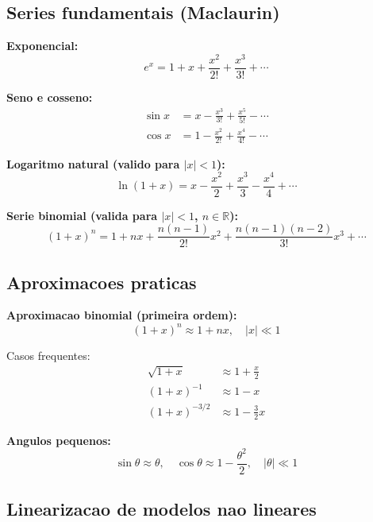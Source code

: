 \documentclass[12pt,a4paper]{article}
\begin{document}
\subsection*{Series fundamentais (Maclaurin)}

\textbf{Exponencial:}
\begin{equation}
e^x = 1 + x + \frac{x^2}{2!} + \frac{x^3}{3!} + \cdots
\end{equation}

\textbf{Seno e cosseno:}
\begin{align}
\sin x &= x - \frac{x^3}{3!} + \frac{x^5}{5!} - \cdots \\
\cos x &= 1 - \frac{x^2}{2!} + \frac{x^4}{4!} - \cdots
\end{align}

\textbf{Logaritmo natural (valido para $|x|<1$):}
\begin{equation}
\ln(1+x) = x - \frac{x^2}{2} + \frac{x^3}{3} - \frac{x^4}{4} + \cdots
\end{equation}

\textbf{Serie binomial (valida para $|x|<1$, $n \in \mathbb{R}$):}
\begin{equation}
(1+x)^n = 1 + nx + \frac{n(n-1)}{2!}x^2 + \frac{n(n-1)(n-2)}{3!}x^3 + \cdots
\end{equation}

\subsection*{Aproximacoes praticas}

\textbf{Aproximacao binomial (primeira ordem):}
\begin{equation}
(1+x)^n \approx 1 + nx, \quad |x| \ll 1
\end{equation}

Casos frequentes:
\begin{align}
\sqrt{1+x} &\approx 1 + \frac{x}{2} \\
(1+x)^{-1} &\approx 1 - x \\
(1+x)^{-3/2} &\approx 1 - \frac{3}{2}x
\end{align}

\textbf{Angulos pequenos:}
\begin{equation}
\sin\theta \approx \theta, \quad \cos\theta \approx 1 - \frac{\theta^2}{2}, \quad |\theta| \ll 1
\end{equation}

\subsection*{Linearizacao de modelos nao lineares}
\end{document}
